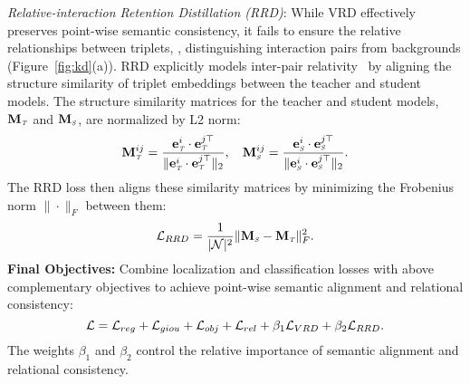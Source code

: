 \textit{Relative-interaction Retention Distillation (RRD)}: While VRD effectively preserves point-wise semantic consistency, it fails to ensure the relative relationships between triplets, \ie, distinguishing interaction pairs from backgrounds (\cf Figure~\ref{fig:kd}(a)). $\!$RRD explicitly models inter-pair relativity~\cite{NEURIPS2022_dabf6125} by aligning the structure similarity of triplet embeddings between the teacher and student models. The structure similarity matrices for the teacher and student models, $\mathbf{M}_{\text{\textit{\tiny{T}}}}$ and $\mathbf{M}_{\text{\textit{\tiny{S}}}}$, are normalized by L2 norm:
\begin{equation}
\small
\mathbf{M}_{\text{\textit{\tiny{T}}}}^{ij} = \frac{ \mathbf{e}_{\text{\textit{\tiny{T}}}}^i \cdot \mathbf{e}_{\text{\textit{\tiny{T}}}}^{j\top} }{\| \mathbf{e}_{\text{\textit{\tiny{T}}}}^i \cdot\mathbf{e}_{\text{\textit{\tiny{T}}}}^{j\top} \|_{2}}, \quad
\mathbf{M}_{\text{\textit{\tiny{S}}}}^{ij} = \frac{ \mathbf{e}_{\text{\textit{\tiny{S}}}}^i \cdot \mathbf{e}_{\text{\textit{\tiny{S}}}}^{j\top} }{\| \mathbf{e}_{\text{\textit{\tiny{S}}}}^i \cdot \mathbf{e}_{\text{\textit{\tiny{S}}}}^{j\top} \|_{2}}.
\label{eq:cosine_similarity}
\end{equation}
The RRD loss then aligns these similarity matrices by minimizing the Frobenius norm $\| \cdot \|_F$ between them:
\begin{equation}
\small
\mathcal{L}_{{RRD}} = \frac{1}{|\mathcal{N}|^2} \| \mathbf{M}_{\text{\textit{\tiny{S}}}} - \mathbf{M}_{\text{\textit{\tiny{T}}}} \|_F^2.
\label{eq:relative_interaction_kd}
\end{equation}
\textbf{Final Objectives:} Combine localization and classification losses with above complementary objectives to achieve point-wise semantic alignment and relational consistency:
\begin{equation}
\small
\mathcal{L} = \mathcal{L}_{reg} + \mathcal{L}_{giou}  + \mathcal{L}_{obj} + \mathcal{L}_{rel} + \beta_1 \mathcal{L}_{{VRD}} + \beta_2 \mathcal{L}_{{RRD}}.
\end{equation}
The weights $\beta_1$ and $\beta_2$ control the relative importance of semantic alignment and relational consistency.

